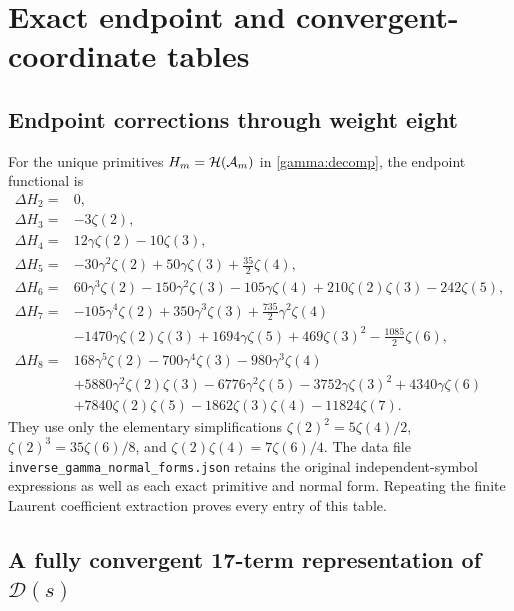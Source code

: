 \section{Exact endpoint and convergent-coordinate tables}
\label{tables:sec}

\subsection{Endpoint corrections through weight eight}
\label{tables:boundaries}

For the unique primitives $H_m=\mathcal H(\mathcal A_m)$ in
\eqref{gamma:decomp}, the endpoint functional is
\begin{align*}
 \Delta H_2={}&0,\\
 \Delta H_3={}&-3\zeta(2),\\
 \Delta H_4={}&12\gamma\zeta(2)-10\zeta(3),\\
 \Delta H_5={}&-30\gamma^2\zeta(2)+50\gamma\zeta(3)
                                      +\tfrac{35}{2}\zeta(4),\\
 \Delta H_6={}&60\gamma^3\zeta(2)-150\gamma^2\zeta(3)
 -105\gamma\zeta(4)+210\zeta(2)\zeta(3)-242\zeta(5),\\
 \Delta H_7={}&-105\gamma^4\zeta(2)+350\gamma^3\zeta(3)
                     +\tfrac{735}{2}\gamma^2\zeta(4)\\
 &-1470\gamma\zeta(2)\zeta(3)+1694\gamma\zeta(5)
                +469\zeta(3)^2-\tfrac{1085}{2}\zeta(6),\\
 \Delta H_8={}&168\gamma^5\zeta(2)-700\gamma^4\zeta(3)
                          -980\gamma^3\zeta(4)\\
 &+5880\gamma^2\zeta(2)\zeta(3)-6776\gamma^2\zeta(5)
             -3752\gamma\zeta(3)^2+4340\gamma\zeta(6)\\
 &+7840\zeta(2)\zeta(5)-1862\zeta(3)\zeta(4)-11824\zeta(7).
\end{align*}
They use only the elementary simplifications
$\zeta(2)^2=5\zeta(4)/2$,
$\zeta(2)^3=35\zeta(6)/8$, and
$\zeta(2)\zeta(4)=7\zeta(6)/4$.
The data file \texttt{inverse\_gamma\_normal\_forms.json} retains
the original independent-symbol expressions as well as each exact
primitive and normal form.  Repeating the finite Laurent coefficient
extraction proves every entry of this table.

\subsection{A fully convergent 17-term representation of \texorpdfstring{$\mathcal D(s)$}{D(s)}}
\label{tables:omega-convergent}

